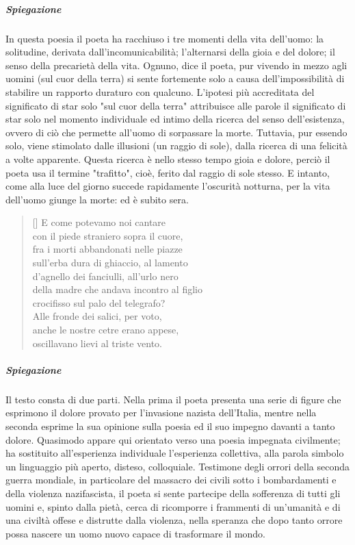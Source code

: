 \documentclass[12pt]{report}
\begin{document}
		\subparagraph[Ed è subito sera]{Spiegazione}
		In questa poesia il poeta ha racchiuso i tre momenti della vita dell'uomo: la solitudine, derivata dall'incomunicabilità; l'alternarsi della gioia e del dolore; il senso della precarietà della vita. Ognuno, dice il poeta, pur vivendo in mezzo agli uomini (sul cuor della terra) si sente fortemente solo a causa dell'impossibilità di stabilire un rapporto duraturo con qualcuno. L'ipotesi più accreditata del significato di star solo "sul cuor della terra" attribuisce alle parole il significato di star solo nel momento individuale ed intimo della ricerca del senso dell'esistenza, ovvero di ciò che permette all'uomo di sorpassare la morte. Tuttavia, pur essendo solo, viene stimolato dalle illusioni (un raggio di sole), dalla ricerca di una felicità a volte apparente. Questa ricerca è nello stesso tempo gioia e dolore, perciò il poeta usa il termine "trafitto", cioè, ferito dal raggio di sole stesso. E intanto, come alla luce del giorno succede rapidamente l'oscurità notturna, per la vita dell'uomo giunge la morte: ed è subito sera.
	
		\renewcommand{\poemtoc}{subsection}
		\settowidth{\versewidth}{There was an old party of Lyme}
		\begin{verse}[\versewidth]
			E come potevamo noi cantare\\
			con il piede straniero sopra il cuore,\\
			fra i morti abbandonati nelle piazze\\
			sull’erba dura di ghiaccio, al lamento\\
			d’agnello dei fanciulli, all’urlo nero\\
			della madre che andava incontro al figlio\\
			crocifisso sul palo del telegrafo?\\
			Alle fronde dei salici, per voto,\\
			anche le nostre cetre erano appese,\\
			oscillavano lievi al triste vento.\\
		\end{verse}
	
			\subparagraph[Alle fronte dei salici]{Spiegazione}
		Il testo consta di due parti. Nella prima il poeta presenta una serie di figure che esprimono il dolore provato per l'invasione nazista dell'Italia, mentre nella seconda esprime la sua opinione sulla poesia ed il suo impegno davanti a tanto dolore.
		Quasimodo appare qui orientato verso una poesia impegnata civilmente; ha sostituito all’esperienza individuale l’esperienza collettiva, alla parola simbolo un linguaggio più aperto, disteso, colloquiale. Testimone degli orrori della seconda guerra mondiale, in particolare del massacro dei civili sotto i bombardamenti e della violenza nazifascista, il poeta si sente partecipe della sofferenza di tutti gli uomini e, spinto dalla pietà, cerca di ricomporre i frammenti di un’umanità e di una civiltà offese e distrutte dalla violenza, nella speranza che dopo tanto orrore possa nascere un uomo nuovo capace di trasformare il mondo.
		
\end{document}
